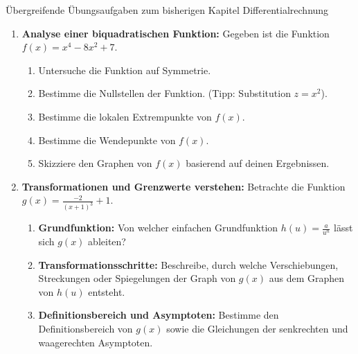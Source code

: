 \begin{aufgabenumgebung}[A:DiffUebergreifend]{Übergreifende Übungsaufgaben zum bisherigen Kapitel Differentialrechnung}
\begin{enumerate}
\begin{enumerate}
\begin{tippumgebung}{Umgang mit $\pi$}
            \end{tippumgebung}
            \item \textbf{Ableitung bilden:} Bilde die erste Ableitung $O'(r)$. (Hinweis: $O(r)$ wird einen Term der Form $\frac{k}{r}$ enthalten, was du als $kr^{-1}$ schreiben kannst.)
            \item \textbf{Extremstelle finden:} Setze $O'(r)=0$ und löse nach $r$ auf, um den Radius zu finden, der die Oberfläche minimiert.
            \item \textbf{Überprüfung (optional für Experten):} Überprüfe mit der zweiten Ableitung $O''(r)$, ob es sich tatsächlich um ein Minimum handelt.
            \item \textbf{Optimale Abmessungen:} Berechne die zugehörige Höhe $h$ und das minimale Oberflächenmaterial. Welcher Zusammenhang besteht zwischen $r$ und $h$ bei minimaler Oberfläche?
        \end{enumerate}
    \item \textbf{Analyse einer biquadratischen Funktion:}
        Gegeben ist die Funktion $f(x) = x^4 - 8x^2 + 7$.
        \begin{enumerate}
            \item Untersuche die Funktion auf Symmetrie.
            \item Bestimme die Nullstellen der Funktion. (Tipp: Substitution $z=x^2$).
            \item Bestimme die lokalen Extrempunkte von $f(x)$.
            \item Bestimme die Wendepunkte von $f(x)$.
            \item Skizziere den Graphen von $f(x)$ basierend auf deinen Ergebnissen.
        \end{enumerate}
    \item \textbf{Transformationen und Grenzwerte verstehen:}
        Betrachte die Funktion $g(x) = \frac{-2}{(x+1)^3} + 1$.
        \begin{enumerate}
            \item \textbf{Grundfunktion:} Von welcher einfachen Grundfunktion $h(u) = \frac{a}{u^n}$ lässt sich $g(x)$ ableiten?
            \item \textbf{Transformationsschritte:} Beschreibe, durch welche Verschiebungen, Streckungen oder Spiegelungen der Graph von $g(x)$ aus dem Graphen von $h(u)$ entsteht.
            \item \textbf{Definitionsbereich und Asymptoten:} Bestimme den Definitionsbereich von $g(x)$ sowie die Gleichungen der senkrechten und waagerechten Asymptoten.

\end{enumerate}
\end{enumerate}
\end{aufgabenumgebung}
